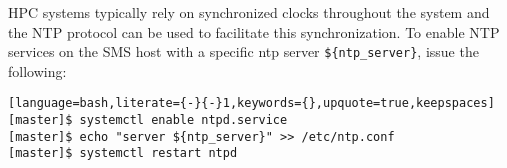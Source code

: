 HPC systems typically rely on synchronized clocks throughout the system and the
NTP protocol can be used to facilitate this synchronization.  To enable NTP
services on the SMS host with a specific ntp server \texttt{\$\{ntp\_server\}},
issue the following:

\begin{lstlisting}[language=bash,literate={-}{-}1,keywords={},upquote=true,keepspaces]
[master]$ systemctl enable ntpd.service
[master]$ echo "server ${ntp_server}" >> /etc/ntp.conf
[master]$ systemctl restart ntpd
\end{lstlisting}

